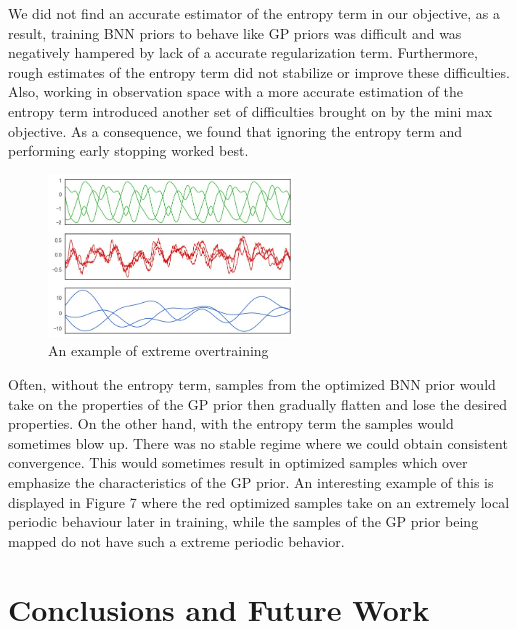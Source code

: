 \documentclass{article}
\begin{document}
We did not find an accurate estimator of the entropy term in our objective, as a result, training BNN priors
to behave like GP priors was difficult and was negatively hampered by lack of a accurate regularization term. 
Furthermore, rough estimates of the entropy term did not stabilize or improve these difficulties. Also, working 
in observation space with a more accurate estimation of the entropy term introduced another set of difficulties 
brought on by the mini max objective. As a consequence, we found that ignoring the entropy term and performing 
early stopping worked best. 

\begin{figure}
  \begin{center}
    \includegraphics[width=0.58\textwidth]{figs/overfit}
  \end{center}
  \caption{An example of extreme overtraining}
\end{figure}

Often, without the entropy term, samples from the optimized BNN prior would take on the properties of the GP prior then gradually flatten and lose the desired properties. On the other hand, with the entropy term the samples would sometimes blow up. There was no stable regime where we could obtain consistent convergence. This would sometimes result in optimized samples which over emphasize the characteristics of the GP prior. 
An interesting example of this is displayed in Figure 7 where the red optimized samples take on an extremely local periodic behaviour later in training, while the samples of the GP prior being mapped do not have such a extreme periodic behavior.  



\section{Conclusions and Future Work}
\end{document}

